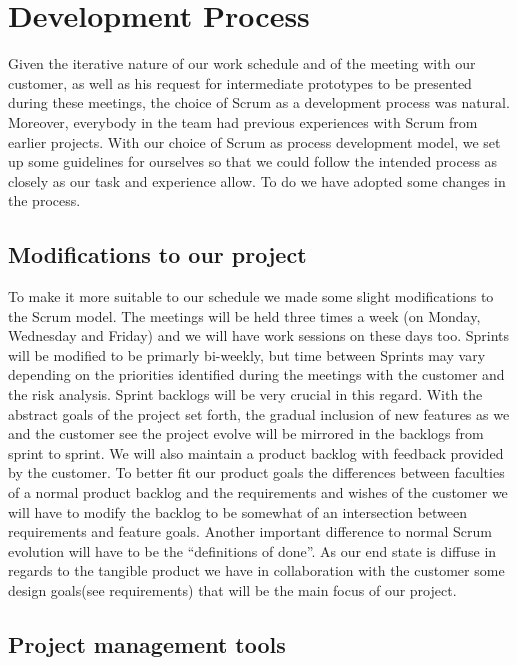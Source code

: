 
\section{Development Process}

Given the iterative nature of our work schedule and of the meeting
with our customer, as well as his request for intermediate prototypes
to be presented during these meetings, the choice of Scrum as a development
process was natural. Moreover, everybody in the team had previous
experiences with Scrum from earlier projects. With our choice of Scrum
as process development model, we set up some guidelines for ourselves
so that we could follow the intended process as closely as our task
and experience allow. To do we have adopted some changes in the process.


\subsection{Modifications to our project}

To make it more suitable to our schedule we made some slight modifications
to the Scrum model. The meetings will be held three times a week (on
Monday, Wednesday and Friday) and we will have work sessions on these
days too. Sprints will be modified to be primarly bi-weekly, but time
between Sprints may vary depending on the priorities identified during
the meetings with the customer and the risk analysis. Sprint backlogs
will be very crucial in this regard. With the abstract goals of the
project set forth, the gradual inclusion of new features as we and
the customer see the project evolve will be mirrored in the backlogs
from sprint to sprint. We will also maintain a product backlog with
feedback provided by the customer. To better fit our product goals
the differences between faculties of a normal product backlog and
the requirements and wishes of the customer we will have to modify
the backlog to be somewhat of an intersection between requirements
and feature goals. Another important difference to normal Scrum evolution
will have to be the “definitions of done”. As our end state is diffuse
in regards to the tangible product we have in collaboration with the
customer some design goals(see requirements) that will be the main
focus of our project.


\subsection{Project management tools}

